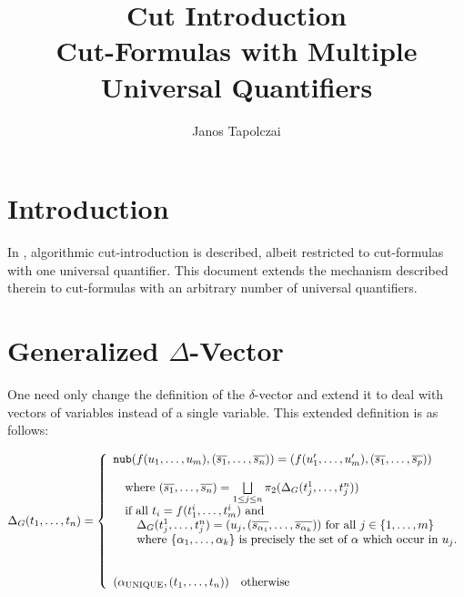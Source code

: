 \documentclass[a4paper, 11pt]{report}
\title{Cut Introduction\\ \vspace{0.5cm} Cut-Formulas with Multiple Universal Quantifiers}
\author{Janos Tapolczai}
\newcommand{\mt}[1]{\textnormal{#1}}
\begin{document}
\maketitle

\section{Introduction}

In \cite[Ch. 5]{cutIntro2013}, algorithmic cut-introduction is described, albeit restricted to cut-formulas with
one universal quantifier. This document extends the mechanism described therein to cut-formulas with an
arbitrary number of universal quantifiers.

\section{Generalized $\Delta$-Vector}

One need only change the definition of the $\delta$-vector and extend it to deal with vectors of variables
instead of a single variable. This extended definition is as follows:

$$
  \Delta_G(t_1,\dots,t_n) = \left\{
    \begin{array}{l}
    \texttt{nub}(f(u_1,\dots,u_m), (\overline{s_1},\dots,\overline{s_n})) = (f(u_1',\dots,u_m'), (\overline{s_1},\dots,\overline{s_p}))\\
    \\
    \quad \textnormal{where } (\overline{s_1},\dots,\overline{s_n}) =
          \bigsqcup\limits_{1 \leq j \leq n}
            \pi_2(\Delta_G(t_j^1,\dots,t_j^n))

    \\
    \quad \textnormal{if all } t_i = f(t_1^i,\dots,t_m^i) \mt{ and}\\
    \quad \quad
      \Delta_G(t_j^1,\dots,t_j^n) = (u_j, (\overline{s_{\alpha_1}},\dots,\overline{s_{\alpha_k}})) \mt{ for all } j \in \{1,\dots,m \}\\
    \quad \quad
      \textnormal{where } \{\alpha_1,\dots,\alpha_k\} \mt{ is precisely the set of $\alpha$ which occur in } u_j.\\

    \\
    \\
    
    (\alpha_{\mt{UNIQUE}},(t_1,\dots,t_n))\quad \mt{otherwise}\\
    \end{array}
  \right.
$$
\end{document}
